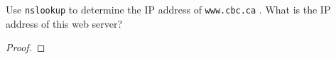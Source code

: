 \documentclass[../../main.tex]{subfiles}
\begin{document}
\begin{wts}
Use \lstinline{nslookup} to determine the IP address of \lstinline{www.cbc.ca} . What is the IP address of this web server?
\end{wts}
\begin{proof}

\end{proof}
\end{document}
